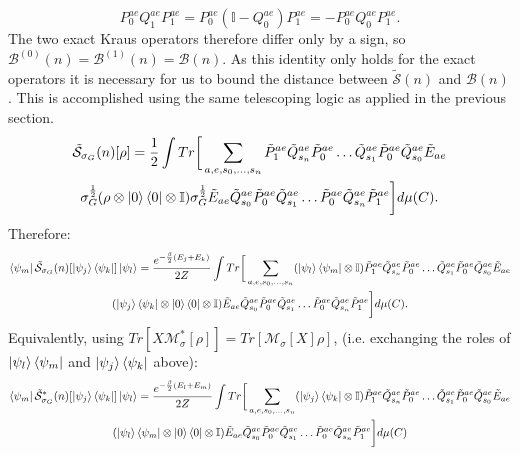 \documentclass[aps,floatfix,10pt,amssymb,amsfont,amsmath,superscriptaddress,float,nofootinbib,longbibliography,nobalancelastpage,twocolumn]{revtex4-2}
\begin{document}
\begin{widetext}
\begin{equation*}
    P^{ae}_0Q^{ae}_1P^{ae}_1
    =P^{ae}_0(\mathbb I-Q^{ae}_0)P^{ae}_1
    =-P^{ae}_0Q^{ae}_0P^{ae}_1.
\end{equation*}
The two exact Kraus operators therefore differ only by a sign, so
$\mathcal{B}^{(0)}(n)=\mathcal{B}^{(1)}(n)=\mathcal{B}(n)$.  As this identity only holds for the exact operators it is necessary for us to bound the distance between $\tilde{\mathcal S}(n)$ and $\mathcal B(n)$. This is accomplished using the same telescoping logic as applied in the previous section.
\begin{multline}
    \tilde{\mathcal{S}}_{\sigma_G}(n)[\rho] = \frac12\int Tr\bigg[ \sum_{a,e,s_0,\ldots,s_n}\tilde P^{ae}_1\tilde Q^{ae}_{s_n}\tilde P^{ae}_0\ldots \tilde Q^{ae}_{s_1}\tilde P^{ae}_0\tilde Q^{ae}_{s_0}\tilde E_{ae} \\\sigma_G^{\frac{1}{2}}(\rho\otimes \ket{0}\bra{0} \otimes \mathbb{I})\sigma_G^{\frac{1}{2}}  \tilde E_{ae}\tilde Q^{ae}_{s_0}\tilde P^{ae}_0\tilde Q^{ae}_{s_1}\ldots\tilde P^{ae}_0\tilde Q^{ae}_{s_n}\tilde P^{ae}_1\bigg]d\mu(C).
\end{multline}
Therefore:
\begin{multline}
    \bra{\psi_m}\tilde{\mathcal{S}}_{\sigma_G}(n)[\ket{\psi_j}\bra{\psi_k}]\ket{\psi_l} = \frac{e^{-\frac{\beta}{2}(E_j+E_k)}}{2Z}\int Tr\bigg[ \sum_{a,e,s_0,\ldots,s_n}(\ket{\psi_l}\bra{\psi_m}\otimes \mathbb{I})\tilde P^{ae}_1\tilde Q^{ae}_{s_n}\tilde P^{ae}_0\ldots\tilde Q^{ae}_{s_1}\tilde P^{ae}_0\tilde Q^{ae}_{s_0}\tilde E_{ae} \\(\ket{\psi_j}\bra{\psi_k}\otimes \ket{0}\bra{0}\otimes \mathbb{I})  \tilde E_{ae}\tilde Q^{ae}_{s_0}\tilde P^{ae}_0\tilde Q^{ae}_{s_1}\ldots\tilde P^{ae}_0\tilde Q^{ae}_{s_n}\tilde P^{ae}_1\bigg]d\mu(C).
\end{multline}
Equivalently, using $Tr[X\mathcal{M}^*_{\sigma}[\rho]] = Tr[\mathcal{M}_{\sigma}[X]\rho]$, (i.e. exchanging the roles of $\ket{\psi_l}\bra{\psi_m}$ and $\ket{\psi_j}\bra{\psi_k}$ above):
\begin{multline}
       \bra{\psi_m}\tilde{\mathcal{S}}^*_{\sigma_G}(n)[\ket{\psi_j}\bra{\psi_k}]\ket{\psi_l} = \frac{e^{-\frac{\beta}{2}(E_l+E_m)}}{2Z}\int Tr\bigg[ \sum_{a,e,s_0,\ldots,s_n}(\ket{\psi_j}\bra{\psi_k}\otimes \mathbb{I})\tilde P^{ae}_1\tilde Q^{ae}_{s_n}\tilde P^{ae}_0\ldots\tilde Q^{ae}_{s_1}\tilde P^{ae}_0\tilde Q^{ae}_{s_0}\tilde E_{ae} \\(\ket{\psi_l}\bra{\psi_m}\otimes \ket{0}\bra{0} \otimes \mathbb{I})  \tilde E_{ae}\tilde Q^{ae}_{s_0}\tilde P^{ae}_0\tilde Q^{ae}_{s_1}\ldots\tilde P^{ae}_0\tilde Q^{ae}_{s_n}\tilde P^{ae}_1\bigg]d\mu(C)

\end{multline}
\end{widetext}
\end{document}
